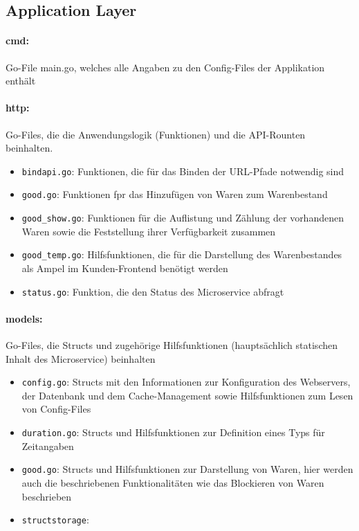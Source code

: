 \subsection{Application Layer}
\label{subsec: Application Layer}

\paragraph{cmd:} Go-File main.go, welches alle Angaben zu den Config-Files der Applikation enthält

\paragraph{http:} Go-Files, die die Anwendungslogik (Funktionen) und die API-Rounten beinhalten.
	\begin{itemize}
	\item \texttt{bindapi.go}: Funktionen, die für das Binden der URL-Pfade notwendig sind
	\item \texttt{good.go}: Funktionen fpr das Hinzufügen von Waren zum Warenbestand
	\item \texttt{good\_show.go}: Funktionen für die Auflistung und Zählung der vorhandenen Waren sowie die Feststellung ihrer Verfügbarkeit zusammen
	\item \texttt{good\_temp.go}: Hilfsfunktionen, die für die Darstellung des Warenbestandes als Ampel im Kunden-Frontend benötigt werden
	\item \texttt{status.go}: Funktion, die den Status des Microservice abfragt 
	\end{itemize}


\paragraph{models:} Go-Files, die Structs und zugehörige Hilfsfunktionen (hauptsächlich statischen Inhalt des Microservice) beinhalten 
	\begin{itemize}
	\item \texttt{config.go}: Structs mit den Informationen zur Konfiguration des Webservers, der Datenbank und dem Cache-Management sowie Hilfsfunktionen zum Lesen von Config-Files
	\item \texttt{duration.go}: Structs und Hilfsfunktionen zur Definition eines Typs für Zeitangaben
	\item \texttt{good.go}: Structs und Hilfsfunktionen zur Darstellung von Waren, hier werden auch die beschriebenen Funktionalitäten wie das Blockieren von Waren beschrieben
	\item \texttt{structstorage}: 
	\end{itemize}



